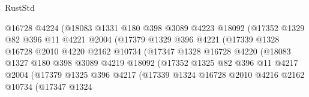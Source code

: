 \begin{lexlean}{RustStd}
\begin{coremodule}
                              @16728
                              @4224
                              (@18083
                                @1331
                                @180
                                @398
                                @3089
                                @4223
                                @18092
                                (@17352
                                  @1329
                                  @82
                                  @396
                                  @11
                                  @4221
                                  @2004
                                  (@17379
                                    @1329
                                    @396
                                    @4221
                                    (@17339
                                      @1328
                                      @16728
                                      @2010
                                      @4220
                                      @2162
                                      @10734
                                      (@17347
                                        @1328
                                        @16728
                                        @4220
                                        (@18083
                                          @1327
                                          @180
                                          @398
                                          @3089
                                          @4219
                                          @18092
                                          (@17352
                                            @1325
                                            @82
                                            @396
                                            @11
                                            @4217
                                            @2004
                                            (@17379
                                              @1325
                                              @396
                                              @4217
                                              (@17339
                                                @1324
                                                @16728
                                                @2010
                                                @4216
                                                @2162
                                                @10734
                                                (@17347
                                                  @1324

\end{coremodule}
\end{lexlean}
